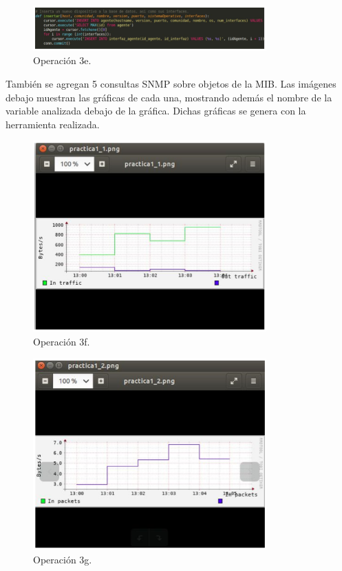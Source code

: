 \begin{figure}[htbp!]
	\centering
		\includegraphics[width=0.8\textwidth]{images/tarea3/op3e}
	\caption{Operación 3e.}
\end{figure}

\noindent
También se agregan 5 consultas SNMP sobre objetos de la MIB. Las imágenes debajo muestran las gráficas de cada una, mostrando además el nombre de la variable analizada debajo de la gráfica. Dichas gráficas se genera con la herramienta realizada.  
 
\begin{figure}[htbp!]
	\centering
		\includegraphics[width=0.8\textwidth]{images/tarea3/op3f}
	\caption{Operación 3f.}
\end{figure}

\begin{figure}[htbp!]
	\centering
		\includegraphics[width=0.8\textwidth]{images/tarea3/op3g}
	\caption{Operación 3g.}
\end{figure}

